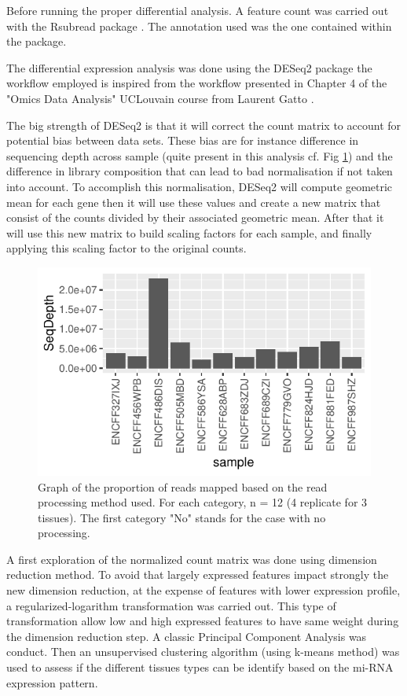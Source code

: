 \documentclass[a4paper, 11pt]{article}
\begin{document}
\begin{multicols}{2}
Before running the proper differential analysis. A feature count was carried out with the Rsubread package \citep{Rsubread}. The annotation used was the one contained within the package. 

The differential expression analysis was done using the DESeq2 package \citep{DESeq2} the workflow employed is inspired from the workflow presented in Chapter 4 of the "Omics Data Analysis" UCLouvain course from Laurent Gatto \citep{Gatto_Loriot}.

The big strength of DESeq2 is that it will correct the count matrix to account for potential bias between data sets. These bias are for instance difference in sequencing depth across sample (quite present in this analysis cf. Fig \ref{fig:depth}) and the difference in library composition that can lead to bad normalisation if not taken into account. To accomplish this normalisation, DESeq2 will compute geometric mean for each gene then it will use these values and create a new matrix that consist of the counts divided by their associated geometric mean. After that it will use this new matrix to build scaling factors for each sample, and finally applying this scaling factor to the original counts.
\begin{figure}[H]
	\centering
	\includegraphics[width=1\columnwidth]{Figures/differential_analysis/depth.pdf}
	\caption{\footnotesize{Graph of the proportion of reads mapped based on the read processing method used. For each category, n = 12 (4 replicate for 3 tissues). The first category "No" stands for the case with no processing.}}
	\label{fig:depth}
\end{figure}

A first exploration of the normalized count matrix was done using dimension reduction method. To avoid that largely expressed features impact strongly the new dimension reduction, at the expense of features with lower expression profile, a regularized-logarithm transformation was carried out. This type of transformation allow low and high expressed features to have same weight during the dimension reduction step. A classic Principal Component Analysis was conduct. Then an unsupervised clustering algorithm (using k-means method) was used to assess if the different tissues types can be identify based on the mi-RNA expression pattern.


\end{multicols}
\end{document}
